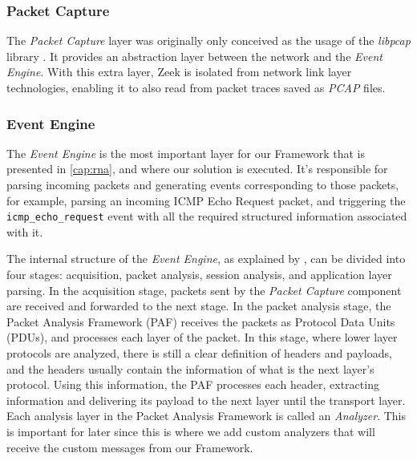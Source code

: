\subsubsection*{Packet Capture}

The \textit{Packet Capture} layer was originally only conceived as the usage of the \textit{libpcap} library \cite{Libpcap}. It provides an abstraction layer between the network and the \textit{Event Engine}. With this extra layer, Zeek is isolated from network link layer technologies, enabling it to also read from packet traces saved as \textit{PCAP} files.

\subsubsection*{Event Engine}
\label{sec:bg:zeek_ee}

The \textit{Event Engine} is the most important layer for our Framework that is presented in \autoref{cap:rna}, and where our solution is executed. It's responsible for parsing incoming packets and generating events corresponding to those packets, for example, parsing an incoming ICMP Echo Request packet, and triggering the \texttt{icmp\_echo\_request} event with all the required structured information associated with it.

The internal structure of the \textit{Event Engine}, as explained by , can be divided into four stages: acquisition, packet analysis, session analysis, and application layer parsing. In the acquisition stage, packets sent by the \textit{Packet Capture} component are received and forwarded to the next stage. In the packet analysis stage, the Packet Analysis Framework (PAF) receives the packets as Protocol Data Units (PDUs), and processes each layer of the packet. In this stage, where lower layer protocols are analyzed, there is still a clear definition of headers and payloads, and the headers usually contain the information of what is the next layer's protocol. Using this information, the PAF processes each header, extracting information and delivering its payload to the next layer until the transport layer. Each analysis layer in the Packet Analysis Framework is called an \textit{Analyzer}. This is important for later since this is where we add custom analyzers that will receive the custom messages from our Framework.

